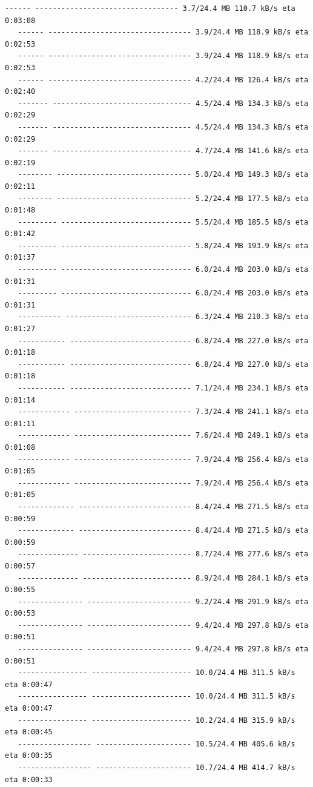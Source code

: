 \documentclass[11pt]{article}
\begin{document}
\begin{Verbatim}[commandchars=\\\{\}]
   ------ --------------------------------- 3.7/24.4 MB 110.7 kB/s eta 0:03:08
   ------ --------------------------------- 3.9/24.4 MB 118.9 kB/s eta 0:02:53
   ------ --------------------------------- 3.9/24.4 MB 118.9 kB/s eta 0:02:53
   ------ --------------------------------- 4.2/24.4 MB 126.4 kB/s eta 0:02:40
   ------- -------------------------------- 4.5/24.4 MB 134.3 kB/s eta 0:02:29
   ------- -------------------------------- 4.5/24.4 MB 134.3 kB/s eta 0:02:29
   ------- -------------------------------- 4.7/24.4 MB 141.6 kB/s eta 0:02:19
   -------- ------------------------------- 5.0/24.4 MB 149.3 kB/s eta 0:02:11
   -------- ------------------------------- 5.2/24.4 MB 177.5 kB/s eta 0:01:48
   --------- ------------------------------ 5.5/24.4 MB 185.5 kB/s eta 0:01:42
   --------- ------------------------------ 5.8/24.4 MB 193.9 kB/s eta 0:01:37
   --------- ------------------------------ 6.0/24.4 MB 203.0 kB/s eta 0:01:31
   --------- ------------------------------ 6.0/24.4 MB 203.0 kB/s eta 0:01:31
   ---------- ----------------------------- 6.3/24.4 MB 210.3 kB/s eta 0:01:27
   ----------- ---------------------------- 6.8/24.4 MB 227.0 kB/s eta 0:01:18
   ----------- ---------------------------- 6.8/24.4 MB 227.0 kB/s eta 0:01:18
   ----------- ---------------------------- 7.1/24.4 MB 234.1 kB/s eta 0:01:14
   ------------ --------------------------- 7.3/24.4 MB 241.1 kB/s eta 0:01:11
   ------------ --------------------------- 7.6/24.4 MB 249.1 kB/s eta 0:01:08
   ------------ --------------------------- 7.9/24.4 MB 256.4 kB/s eta 0:01:05
   ------------ --------------------------- 7.9/24.4 MB 256.4 kB/s eta 0:01:05
   ------------- -------------------------- 8.4/24.4 MB 271.5 kB/s eta 0:00:59
   ------------- -------------------------- 8.4/24.4 MB 271.5 kB/s eta 0:00:59
   -------------- ------------------------- 8.7/24.4 MB 277.6 kB/s eta 0:00:57
   -------------- ------------------------- 8.9/24.4 MB 284.1 kB/s eta 0:00:55
   --------------- ------------------------ 9.2/24.4 MB 291.9 kB/s eta 0:00:53
   --------------- ------------------------ 9.4/24.4 MB 297.8 kB/s eta 0:00:51
   --------------- ------------------------ 9.4/24.4 MB 297.8 kB/s eta 0:00:51
   ---------------- ----------------------- 10.0/24.4 MB 311.5 kB/s eta 0:00:47
   ---------------- ----------------------- 10.0/24.4 MB 311.5 kB/s eta 0:00:47
   ---------------- ----------------------- 10.2/24.4 MB 315.9 kB/s eta 0:00:45
   ----------------- ---------------------- 10.5/24.4 MB 405.6 kB/s eta 0:00:35
   ----------------- ---------------------- 10.7/24.4 MB 414.7 kB/s eta 0:00:33

\end{Verbatim}
\end{document}
